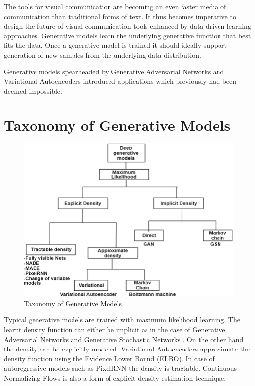 The tools for visual communication are becoming an even faster media of communication than traditional forms of text. It thus becomes imperative to design the future of visual communication tools enhanced by data driven learning approaches. Generative models learn the underlying generative function that best fits the data. Once a generative model is trained it should ideally support generation of new samples from the underlying data distribution. 

Generative models spearheaded by Generative Adversarial Networks \cite{goodfellow2014generative} and Variational Autoencoders \cite{kingma2013auto} introduced applications which previously had been deemed impossible. 


\section{Taxonomy of Generative Models}

\begin{figure}
\includegraphics[width=\linewidth]{figures/intro/taxonomy-generative-models.png}
\caption{Taxonomy of Generative Models}
\label{fig:taxonomy_generative_models}

\end{figure}


Typical generative models are trained with maximum likelihood learning. The learnt density function can either be implicit as in the case of Generative Adversarial Networks\cite{goodfellow2014generative} and Generative Stochastic Networks \cite{alain2016gsns}. On the other hand the density can be explicitly modeled. Variational Autoencoders \cite{kingma2013auto} approximate the density function using the Evidence Lower Bound (ELBO). In case of autoregressive models such as PixelRNN\cite{van2016pixel} the density is tractable. Continuous Normalizing Flows \cite{chen2018neural, grathwohl2018ffjord} is also a form of explicit density estimation technique. 


